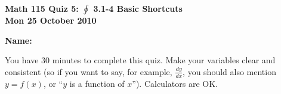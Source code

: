 \documentclass[11pt,letterpaper]{article}
\begin{document}
\flushleft
\begin{multicols}{2}


\begin{large}\textbf{Math 115 Quiz 5: $\oint $ 3.1-4 Basic Shortcuts \\
Mon 25 October 2010}\end{large}

\textbf{Name:  }\underline{\hspace{35ex}}

\vspace{.5in}

\end{multicols}

\pagestyle{empty}

\flushleft

You have 30 minutes to complete this quiz.  Make your variables clear and
consistent (so if you want to say, for example, $\frac{dy}{dx}$, you should also
mention $y=f(x)$, or ``$y$ is a function of $x$'').  Calculators are OK.  
\end{document}
